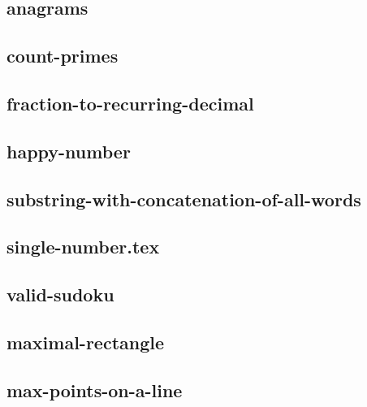\documentclass[a4paper,10pt]{article}
\begin{document}
\begin{CJK}{UTF8}{gbsn}     %

\else

\subsection{anagrams}


\subsection{count-primes}


\subsection{fraction-to-recurring-decimal}


\subsection{happy-number}


\subsection{substring-with-concatenation-of-all-words}


\subsection{single-number.tex}


\subsection{valid-sudoku}


\subsection{maximal-rectangle}


\subsection{max-points-on-a-line}



\end{CJK}
\end{document}
